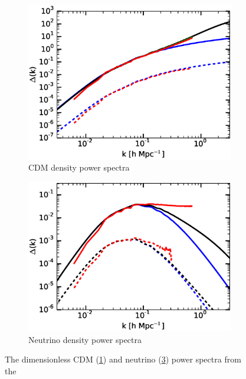 \documentclass{aastex}
\begin{document}
\begin{figure}[h!]
  \centering
  \begin{subfigure}[t]{0.495\textwidth}
    \includegraphics[width=\textwidth]{Figures/density_cdm.eps}
    \caption{CDM density power spectra}\label{fig:densitycdm}
  \end{subfigure}
  \begin{subfigure}[t]{0.495\textwidth}
    \centering
    \includegraphics[width=\textwidth]{Figures/density_nu.eps}
    \caption{Neutrino density power spectra}\label{fig:densitynu}
  \end{subfigure}
  \caption{
    The dimensionless CDM
    (\ref{fig:densitycdm}) and neutrino (\ref{fig:densitynu}) power
      spectra  from the
}
\end{figure}
\end{document}
